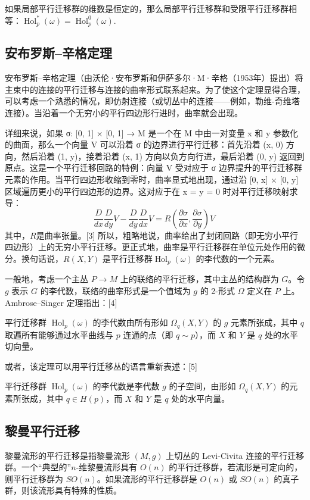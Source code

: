 如果局部平行迁移群的维数是恒定的，那么局部平行迁移群和受限平行迁移群相等：\(\operatorname{Hol}_p^*(\omega) = \operatorname{Hol}_p^0(\omega)\).
\subsection{安布罗斯–辛格定理}  
安布罗斯–辛格定理（由沃伦·安布罗斯和伊萨多尔·M·辛格（1953年）提出）将主束中的连接的平行迁移与连接的曲率形式联系起来。为了使这个定理显得合理，可以考虑一个熟悉的情况，即仿射连接（或切丛中的连接——例如，勒维-奇维塔连接）。当沿着一个无穷小的平行四边形行进时，曲率就会出现。

详细来说，如果 σ: [0, 1] × [0, 1] → M 是一个在 M 中由一对变量 x 和 y 参数化的曲面，那么一个向量 V 可以沿着 σ 的边界进行平行迁移：首先沿着 (x, 0) 方向，然后沿着 (1, y)，接着沿着 (x, 1) 方向以负方向行进，最后沿着 (0, y) 返回到原点。这是一个平行迁移回路的特例：向量 V 受对应于 σ 边界提升的平行迁移群元素的作用。当平行四边形收缩到零时，曲率显式地出现，通过沿 [0, x] × [0, y] 区域遍历更小的平行四边形的边界。这对应于在 x = y = 0 时对平行迁移映射求导：
\[
\frac{D}{dx} \frac{D}{dy} V - \frac{D}{dy} \frac{D}{dx} V = R\left(\frac{\partial \sigma}{\partial x}, \frac{\partial \sigma}{\partial y}\right) V~
\]
其中，\(R\)是曲率张量。[3] 所以，粗略地说，曲率给出了封闭回路（即无穷小平行四边形）上的无穷小平行迁移。更正式地，曲率是平行迁移群在单位元处作用的微分。换句话说，\(R(X, Y)\) 是平行迁移群\(\operatorname{Hol}_p(\omega)\) 的李代数的一个元素。

一般地，考虑一个主丛 \( P \to M \) 上的联络的平行迁移，其中主丛的结构群为 \( G \)。令 \( g \) 表示 \( G \) 的李代数，联络的曲率形式是一个值域为 \( g \) 的 2-形式 \( \Omega \) 定义在 \( P \) 上。Ambrose–Singer 定理指出：[4]

平行迁移群 \( \operatorname{Hol}_p(\omega) \) 的李代数由所有形如 \( \Omega_q(X, Y) \) 的 \( g \) 元素所张成，其中 \( q \) 取遍所有能够通过水平曲线与 \( p \) 连通的点（即 \( q \sim p \)），而 \( X \) 和 \( Y \) 是 \( q \) 处的水平切向量。

或者，该定理可以用平行迁移丛的语言重新表述：[5]

平行迁移群 \( \operatorname{Hol}_p(\omega) \) 的李代数是李代数 \( g \) 的子空间，由形如 \( \Omega_q(X, Y) \) 的元素所张成，其中 \( q \in H(p) \)，而 \( X \) 和 \( Y \) 是 \( q \) 处的水平向量。
\subsection{黎曼平行迁移}
黎曼流形的平行迁移是指黎曼流形 \((M, g)\) 上切丛的 Levi-Civita 连接的平行迁移群。一个“典型的”\(n\)-维黎曼流形具有 \(O(n)\) 的平行迁移群，若流形是可定向的，则平行迁移群为 \(SO(n)\)。如果流形的平行迁移群是 \(O(n)\) 或 \(SO(n)\) 的真子群，则该流形具有特殊的性质。

